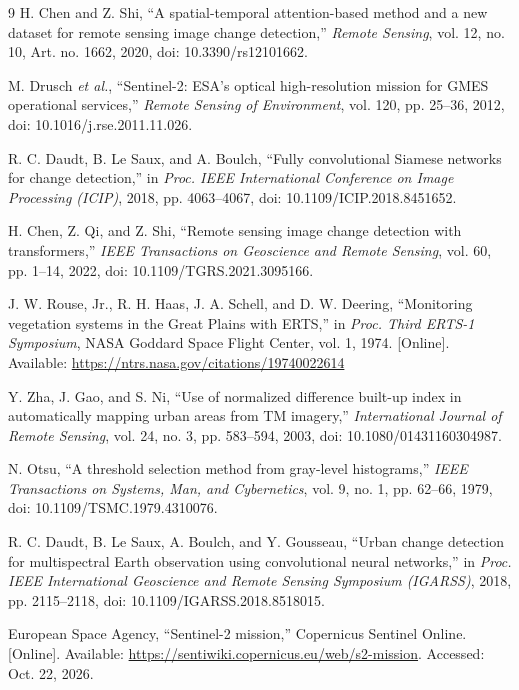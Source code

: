 \documentclass[conference]{IEEEtran}
\begin{document}
\begin{thebibliography}{9}
H. Chen and Z. Shi, ``A spatial-temporal attention-based method and a new
dataset for remote sensing image change detection,'' \emph{Remote Sensing},
vol. 12, no. 10, Art. no. 1662, 2020, doi: 10.3390/rs12101662.

M. Drusch \emph{et al.}, ``Sentinel-2: ESA's optical high-resolution mission
for GMES operational services,'' \emph{Remote Sensing of Environment},
vol. 120, pp. 25--36, 2012, doi: 10.1016/j.rse.2011.11.026.

R. C. Daudt, B. Le Saux, and A. Boulch, ``Fully convolutional Siamese
networks for change detection,'' in \emph{Proc. IEEE International Conference
on Image Processing (ICIP)}, 2018, pp. 4063--4067,
doi: 10.1109/ICIP.2018.8451652.

H. Chen, Z. Qi, and Z. Shi, ``Remote sensing image change detection with
transformers,'' \emph{IEEE Transactions on Geoscience and Remote Sensing},
vol. 60, pp. 1--14, 2022, doi: 10.1109/TGRS.2021.3095166.

J. W. Rouse, Jr., R. H. Haas, J. A. Schell, and D. W. Deering, ``Monitoring
vegetation systems in the Great Plains with ERTS,'' in \emph{Proc. Third
ERTS-1 Symposium}, NASA Goddard Space Flight Center, vol. 1, 1974. [Online].
Available: \url{https://ntrs.nasa.gov/citations/19740022614}

Y. Zha, J. Gao, and S. Ni, ``Use of normalized difference built-up index in
automatically mapping urban areas from TM imagery,'' \emph{International
Journal of Remote Sensing}, vol. 24, no. 3, pp. 583--594, 2003,
doi: 10.1080/01431160304987.

N. Otsu, ``A threshold selection method from gray-level histograms,''
\emph{IEEE Transactions on Systems, Man, and Cybernetics}, vol. 9, no. 1,
pp. 62--66, 1979, doi: 10.1109/TSMC.1979.4310076.

R. C. Daudt, B. Le Saux, A. Boulch, and Y. Gousseau, ``Urban change detection
for multispectral Earth observation using convolutional neural networks,'' in
\emph{Proc. IEEE International Geoscience and Remote Sensing Symposium
(IGARSS)}, 2018, pp. 2115--2118, doi: 10.1109/IGARSS.2018.8518015.

European Space Agency, ``Sentinel-2 mission,'' Copernicus Sentinel Online.
[Online]. Available: \url{https://sentiwiki.copernicus.eu/web/s2-mission}.
Accessed: Oct. 22, 2026.
\end{thebibliography}
\end{document}
